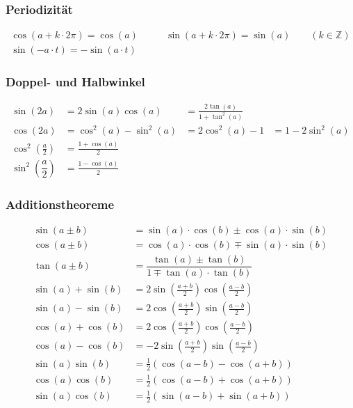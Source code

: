 \subsubsection{Periodizität}
\begin{align*}
	\cos(a+k\cdot2\pi)=\cos(a) &\qquad \sin(a+k\cdot2\pi)=\sin(a) \qquad
(k \in \mathbb{Z})\\
\sin(-a\cdot t) = -\sin(a\cdot t)&\qquad 
\end{align*}

\subsubsection{Doppel- und Halbwinkel}	
\begin{align*}
	\sin(2a) &=2\sin(a)\cos(a) &= \frac{2\tan(a)}{1 +\tan^2(a)}\\
	\cos(2a) &=\cos^2(a)-\sin^2(a) &= 2\cos^2(a)-1 &= 1-2\sin^2(a)\\
	\cos^2 \left(\frac{a}{2}\right) &=\frac{1+\cos(a)}{2} \\
	\sin^2 \left(\dfrac{a}{2}\right)&=\frac{1-\cos(a)}{2}
\end{align*}


\subsubsection{Additionstheoreme}
\begin{align*}
	\sin(a \pm b)&=\sin(a) \cdot \cos(b) \pm \cos(a) \cdot \sin(b)\\
	\cos(a \pm b)&=\cos(a) \cdot \cos(b) \mp \sin(a) \cdot \sin(b)\\	
	\tan(a \pm b)&=\dfrac{\tan(a) \pm \tan(b)}{1 \mp \tan(a) \cdot \tan(b)}\\
	\sin(a)+\sin(b) &= 2\sin\left(\frac{a + b}{2}\right)\cos\left(\frac{a - b}{2}\right)\\
	\sin(a)-\sin(b) &= 2\cos\left(\frac{a + b}{2}\right)\sin\left(\frac{a - b}{2}\right)\\
	\cos(a)+\cos(b) &= 2\cos\left(\frac{a + b}{2}\right)\cos\left(\frac{a - b}{2}\right)\\
	\cos(a)-\cos(b) &= -2\sin\left(\frac{a + b}{2}\right)\sin\left(\frac{a - b}{2}\right)\\
	\sin(a)\sin(b)&=\frac{1}{2}(\cos(a-b)-\cos(a+b))\\
	\cos(a)\cos(b)&=\frac{1}{2}(\cos(a-b)+\cos(a+b))\\
	\sin(a)\cos(b)&=\frac{1}{2}(\sin(a-b)+\sin(a+b))\\
\end{align*}

